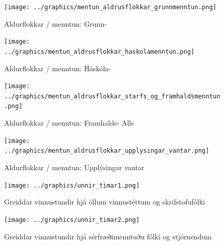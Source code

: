 \documentclass[12pt, git, draft]{rureport}
\begin{document}
\begin{figure}
	\centering 
	\texttt{[image: ../graphics/mentun\_aldrusflokkar\_grunnmenntun.png]}
	\caption{Aldurflokkar / menntun: Grunn- \label{fig:menntungrunn}}
\end{figure}

\begin{figure}
	\centering 
	\texttt{[image: ../graphics/mentun\_aldrusflokkar\_haskolamenntun.png]}
	\caption{Aldurflokkar / menntun: Háskóla- \label{fig:menntunhs}}
\end{figure}

\begin{figure}
	\centering 
	\texttt{[image: ../graphics/mentun\_aldrusflokkar\_starfs\_og\_framhaldsmenntun.png]}
	\caption{Aldurflokkar / menntun: Framhalds- Alls \label{fig:menntunfram}}
\end{figure}

\begin{figure}
	\centering 
	\texttt{[image: ../graphics/mentun\_aldrusflokkar\_upplysingar\_vantar.png]}
	\caption{Aldurflokkar / menntun: Upplýsingar vantar \label{fig:menntunvantar}}
\end{figure}

\begin{figure}
	\centering 
	\texttt{[image: ../graphics/unnir\_timar1.png]}
	\caption{Greiddar vinnustundir hjá öllum vinnustéttum og skrifstofufólki \label{fig:unnirtimar1}}
\end{figure}

\begin{figure}
	\centering 
	\texttt{[image: ../graphics/unnir\_timar2.png]}
	\caption{Greiddar vinnustundir hjá sérfræðimenntuðu fólki og stjórnendum \label{fig:unnirtimar2}}
\end{figure}

%
\printbibliography
\end{document}
